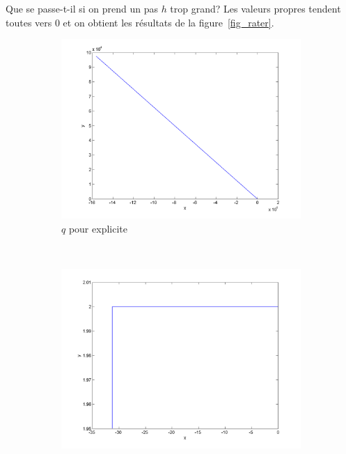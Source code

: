 Que se passe-t-il si on prend un pas $h$ trop grand?
Les valeurs propres tendent toutes vers 0 et on obtient les résultats de la figure~\ref{fig_rater}.

\begin{figure}
  \centering
  \begin{subfigure}[b]{0.3\textwidth}
    \includegraphics[width=\textwidth]{images/Q1_explicite_rate_q.png}
    \caption{$q$ pour explicite}
    \label{fig:q1_explicite_rate_q}
  \end{subfigure}%
  ~ %
  \begin{subfigure}[b]{0.3\textwidth}
    \includegraphics[width=\textwidth]{images/Q1_explicite_rate_p.png}

\end{subfigure}
\end{figure}
